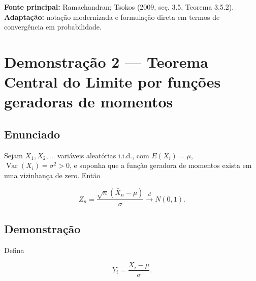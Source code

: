 \documentclass[
  letterpaper,
  DIV=11,
  numbers=noendperiod]{scrreprt}
\begin{document}
\begin{tcolorbox}[enhanced jigsaw, colback=white, leftrule=.75mm, colbacktitle=quarto-callout-note-color!10!white, breakable, titlerule=0mm, bottomtitle=1mm, title=\textcolor{quarto-callout-note-color}{\faInfo}\hspace{0.5em}{Fonte da demonstração}, colframe=quarto-callout-note-color-frame, toprule=.15mm, opacityback=0, bottomrule=.15mm, opacitybacktitle=0.6, arc=.35mm, toptitle=1mm, rightrule=.15mm, coltitle=black, left=2mm]

\textbf{Fonte principal:} Ramachandran; Tsokos (2009, seç. 3.5, Teorema
3.5.2).\\
\textbf{Adaptação:} notação modernizada e formulação direta em termos de
convergência em probabilidade.

\end{tcolorbox}

\section*{Demonstração 2 --- Teorema Central do Limite por funções
geradoras de
momentos}\label{demonstrauxe7uxe3o-2-teorema-central-do-limite-por-funuxe7uxf5es-geradoras-de-momentos}


\subsection*{Enunciado}\label{enunciado-1}

Sejam \(X_1,X_2,\ldots\) variáveis aleatórias i.i.d., com
\(E(X_i)=\mu\), \(\operatorname{Var}(X_i)=\sigma^2>0\), e suponha que a
função geradora de momentos exista em uma vizinhança de zero. Então

\[
Z_n=\frac{\sqrt n(\bar X_n-\mu)}{\sigma}
\xrightarrow{d}N(0,1).
\]

\subsection*{Demonstração}\label{demonstrauxe7uxe3o-2}

Defina

\[
Y_i=\frac{X_i-\mu}{\sigma}.
\]
\end{document}
